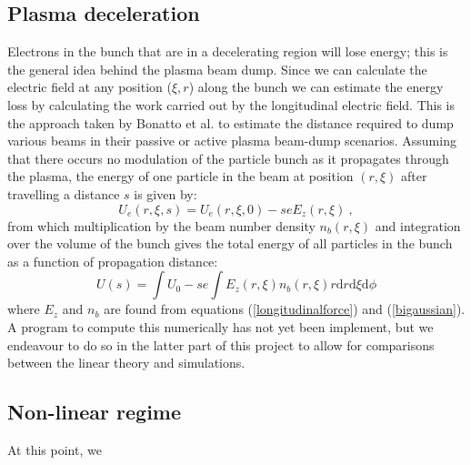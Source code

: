 \subsection{Plasma deceleration}
Electrons in the bunch that are in a decelerating region will lose energy; this is the general idea behind the plasma beam dump. Since we can calculate the electric field at any position ($\xi,r$) along the bunch we can estimate the energy loss by calculating the work carried out by the longitudinal electric field. This is the approach taken by Bonatto et al. \cite{Bonatto2016} to estimate the distance required to dump various beams in their passive or active plasma beam-dump scenarios. Assuming that there occurs no modulation of the particle bunch as it propagates through the plasma, the energy of one particle in the beam at position $(r,\xi)$ after travelling a distance $s$ is given by:
\begin{equation}
U_e(r,\xi,s)=U_e(r,\xi,0)-seE_z(r,\xi)~,
\end{equation}
from which multiplication by the beam number density $n_b(r,\xi)$ and integration over the volume of the bunch gives the total energy of all particles in the bunch as a function of propagation distance:
\begin{equation}
U(s)=\int  U_0-se\int E_z(r,\xi)n_b(r,\xi)r\mathrm{d}r\mathrm{d}\xi\mathrm{d}\phi
\label{energy_loss_bonatto}
\end{equation}
where $E_z$ and $n_b$ are found from equations (\ref{longitudinalforce}) and (\ref{bigaussian}). A program to compute this numerically has not yet been implement, but we endeavour to do so in the latter part of this project to allow for comparisons between the linear theory and simulations.

\subsection{Non-linear regime}
At this point, we 